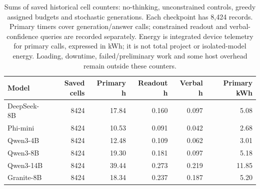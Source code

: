 \begin{table}[H]
\centering\small
\caption{Sums of saved historical cell counters: no-thinking, unconstrained controls, greedy assigned budgets and stochastic generations. Each checkpoint has 8,424 records. Primary timers cover generation/answer calls; constrained readout and verbal-confidence queries are recorded separately. Energy is integrated device telemetry for primary calls, expressed in kWh; it is not total project or isolated-model energy. Loading, downtime, failed/preliminary work and some host overhead remain outside these counters.}
\label{tab:cpucompute}
\setlength{\tabcolsep}{4pt}
\begin{tabular}{lrrrrr}
\toprule
Model & Saved cells & Primary h & Readout h & Verbal h & Primary kWh \\
\midrule
DeepSeek-8B & 8424 & 17.84 & 0.160 & 0.097 & 5.08 \\
Phi-mini & 8424 & 10.53 & 0.091 & 0.042 & 2.68 \\
Qwen3-4B & 8424 & 12.48 & 0.109 & 0.062 & 3.01 \\
Qwen3-8B & 8424 & 19.30 & 0.181 & 0.097 & 5.18 \\
Qwen3-14B & 8424 & 39.44 & 0.273 & 0.219 & 11.85 \\
Granite-8B & 8424 & 18.34 & 0.237 & 0.187 & 5.20 \\
\bottomrule
\end{tabular}
\end{table}
